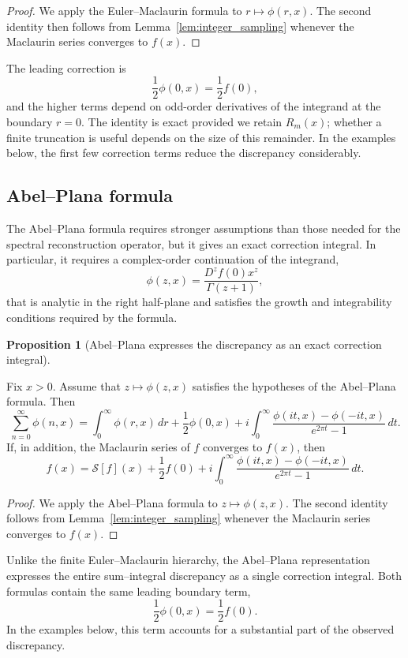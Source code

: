 \documentclass[preprint, 12pt]{elsarticle}
\theoremstyle{definition}
\newtheorem{proposition}[definition]{Proposition}
\theoremstyle{plain}
\theoremstyle{remark}
\begin{document}
\begin{proof}
We apply the Euler--Maclaurin formula to $r\mapsto\phi(r,x)$. The second identity then follows from Lemma~\ref{lem:integer_sampling} whenever the Maclaurin series converges to $f(x)$.
\end{proof}

The leading correction is
\[
\frac12\phi(0,x)=\frac12 f(0),
\]
and the higher terms depend on odd-order derivatives of the integrand at the boundary $r=0$. The identity is exact provided we retain $R_m(x)$; whether a finite truncation is useful depends on the size of this remainder. In the examples below, the first few correction terms reduce the discrepancy considerably.

\subsection{Abel--Plana formula}
The Abel--Plana formula requires stronger assumptions than those needed for the spectral reconstruction operator, but it gives an exact correction integral. In particular, it requires a complex-order continuation of the integrand,
\[
\phi(z,x)
=
\frac{D^z f(0)x^z}{\Gamma(z+1)},
\]
that is analytic in the right half-plane and satisfies the growth and integrability conditions required by the formula.

\begin{proposition}[Abel--Plana expresses the discrepancy as an exact correction integral]
\label{prop:abel_plana_discrepancy}

Fix $x>0$. Assume that $z\mapsto\phi(z,x)$ satisfies the hypotheses of the Abel--Plana formula. Then
\[
\sum_{n=0}^\infty \phi(n,x)
=
\int_0^\infty \phi(r,x)\,dr
+
\frac12\phi(0,x)
+
i
\int_0^\infty
\frac{\phi(it,x)-\phi(-it,x)}
{e^{2\pi t}-1}
\,dt.
\]
If, in addition, the Maclaurin series of $f$ converges to $f(x)$, then
\[
f(x)
=
\mathcal S[f](x)
+
\frac12 f(0)
+
i
\int_0^\infty
\frac{\phi(it,x)-\phi(-it,x)}
{e^{2\pi t}-1}
\,dt.
\]
\end{proposition}

\begin{proof}
We apply the Abel--Plana formula to $z\mapsto\phi(z,x)$. The second identity follows from Lemma~\ref{lem:integer_sampling} whenever the Maclaurin series converges to $f(x)$.
\end{proof}

Unlike the finite Euler--Maclaurin hierarchy, the Abel--Plana representation expresses the entire sum--integral discrepancy as a single correction integral. Both formulas contain the same leading boundary term,
\[
\frac12\phi(0,x)=\frac12 f(0).
\]
In the examples below, this term accounts for a substantial part of the observed discrepancy.
\end{document}
